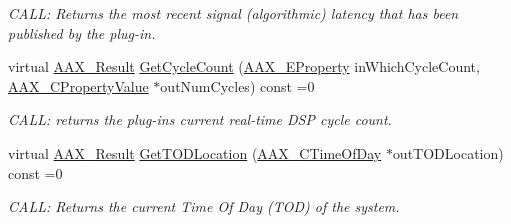 \begin{Indent}
\begin{DoxyCompactItemize}
\begin{DoxyCompactList}\small\item\em C\+A\+LL\+: Returns the most recent signal (algorithmic) latency that has been published by the plug-\/in. \end{DoxyCompactList}\item 
virtual \mbox{\hyperlink{a00392_a4d8f69a697df7f70c3a8e9b8ee130d2f}{A\+A\+X\+\_\+\+Result}} \mbox{\hyperlink{a01789_a26e009667f9cd6c3cccd45b862108bf4}{Get\+Cycle\+Count}} (\mbox{\hyperlink{a00662_a13e384f22825afd3db6d68395b79ce0d}{A\+A\+X\+\_\+\+E\+Property}} in\+Which\+Cycle\+Count, \mbox{\hyperlink{a00392_ab247c0d8686c14e05cbb567ef276f249}{A\+A\+X\+\_\+\+C\+Property\+Value}} $\ast$out\+Num\+Cycles) const =0
\begin{DoxyCompactList}\small\item\em C\+A\+LL\+: returns the plug-\/in\textquotesingle{}s current real-\/time D\+SP cycle count. \end{DoxyCompactList}\item 
virtual \mbox{\hyperlink{a00392_a4d8f69a697df7f70c3a8e9b8ee130d2f}{A\+A\+X\+\_\+\+Result}} \mbox{\hyperlink{a01789_afbc2973d755b6c3ae82b6c8461e9fdee}{Get\+T\+O\+D\+Location}} (\mbox{\hyperlink{a00392_a46542a1dcccdcc3b4260a9926edf8a2a}{A\+A\+X\+\_\+\+C\+Time\+Of\+Day}} $\ast$out\+T\+O\+D\+Location) const =0
\begin{DoxyCompactList}\small\item\em C\+A\+LL\+: Returns the current Time Of Day (T\+OD) of the system. \end{DoxyCompactList}\end{DoxyCompactItemize}
\end{Indent}

